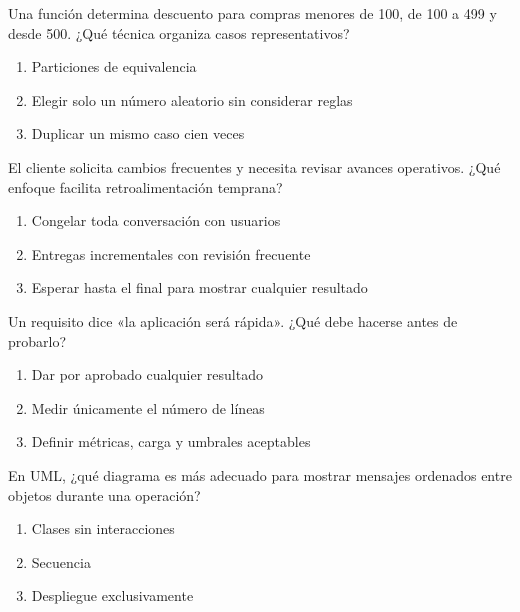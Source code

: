 \noindent\begin{minipage}{\linewidth}\setlength{\parskip}{4pt}\label{q:S-012}
Una función determina descuento para compras menores de 100, de 100 a 499 y desde 500. ¿Qué técnica organiza casos representativos?
\begin{enumerate}[label=\Alph*),nosep]
\item Particiones de equivalencia
\item Elegir solo un número aleatorio sin considerar reglas
\item Duplicar un mismo caso cien veces
\end{enumerate}\end{minipage}\par\medskip

\noindent\begin{minipage}{\linewidth}\setlength{\parskip}{4pt}\label{q:S-013}
El cliente solicita cambios frecuentes y necesita revisar avances operativos. ¿Qué enfoque facilita retroalimentación temprana?
\begin{enumerate}[label=\Alph*),nosep]
\item Congelar toda conversación con usuarios
\item Entregas incrementales con revisión frecuente
\item Esperar hasta el final para mostrar cualquier resultado
\end{enumerate}\end{minipage}\par\medskip

\noindent\begin{minipage}{\linewidth}\setlength{\parskip}{4pt}\label{q:S-014}
Un requisito dice «la aplicación será rápida». ¿Qué debe hacerse antes de probarlo?
\begin{enumerate}[label=\Alph*),nosep]
\item Dar por aprobado cualquier resultado
\item Medir únicamente el número de líneas
\item Definir métricas, carga y umbrales aceptables
\end{enumerate}\end{minipage}\par\medskip

\noindent\begin{minipage}{\linewidth}\setlength{\parskip}{4pt}\label{q:S-015}
En UML, ¿qué diagrama es más adecuado para mostrar mensajes ordenados entre objetos durante una operación?
\begin{enumerate}[label=\Alph*),nosep]
\item Clases sin interacciones
\item Secuencia
\item Despliegue exclusivamente
\end{enumerate}\end{minipage}\par\medskip


